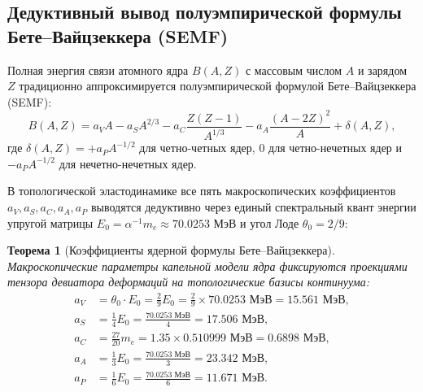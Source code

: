 \documentclass[11pt,a4paper]{article}
\newtheorem{theorem}{Теорема}[section]
\theoremstyle{definition}
\theoremstyle{remark}
\begin{document}
\subsection{Дедуктивный вывод полуэмпирической формулы Бете--Вайцзеккера (SEMF)}
Полная энергия связи атомного ядра $B(A, Z)$ с массовым числом $A$ и зарядом $Z$ традиционно аппроксимируется полуэмпирической формулой Бете--Вайцзеккера (SEMF):
\begin{equation}
    B(A, Z) = a_V A - a_S A^{2/3} - a_C \frac{Z(Z-1)}{A^{1/3}} - a_A \frac{(A - 2Z)^2}{A} + \delta(A, Z),
    \label{eq:weizsaecker_formula}
\end{equation}
где $\delta(A, Z) = +a_P A^{-1/2}$ для четно-четных ядер, $0$ для четно-нечетных ядер и $-a_P A^{-1/2}$ для нечетно-нечетных ядер.

В топологической эластодинамике все пять макроскопических коэффициентов $a_V, a_S, a_C, a_A, a_P$ выводятся дедуктивно через единый спектральный квант энергии упругой матрицы $E_0 = \alpha^{-1} m_e \approx 70.0253\text{ МэВ}$ и угол Лоде $\theta_0 = 2/9$:

\begin{theorem}[Коэффициенты ядерной формулы Бете--Вайцзеккера]
Макроскопические параметры капельной модели ядра фиксируются проекциями тензора девиатора деформаций на топологические базисы континуума:
\begin{align}
    a_V &= \theta_0 \cdot E_0 = \frac{2}{9} E_0 = \frac{2}{9} \times 70.0253\text{ МэВ} = \mathbf{15.561\text{ МэВ}}, \label{eq:av_exact} \\
    a_S &= \frac{1}{4} E_0 = \frac{70.0253\text{ МэВ}}{4} = \mathbf{17.506\text{ МэВ}}, \label{eq:as_exact} \\
    a_C &= \frac{27}{20} m_e = 1.35 \times 0.510999\text{ МэВ} = \mathbf{0.6898\text{ МэВ}}, \label{eq:ac_exact} \\
    a_A &= \frac{1}{3} E_0 = \frac{70.0253\text{ МэВ}}{3} = \mathbf{23.342\text{ МэВ}}, \label{eq:aa_exact} \\
    a_P &= \frac{1}{6} E_0 = \frac{70.0253\text{ МэВ}}{6} = \mathbf{11.671\text{ МэВ}}. \label{eq:ap_exact}
\end{align}
\end{theorem}
\end{document}
